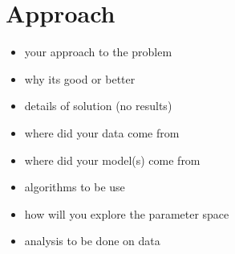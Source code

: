 \section{Approach} \label{sec:Approach}

\begin{itemize}
  \item
    your approach to the problem
  \item
    why its good or better
  \item
    details of solution (no results)
  \item
    where did your data come from
  \item
    where did your model(s) come from
  \item
    algorithms to be use
  \item
    how will you explore the parameter space
  \item
    analysis to be done on data
\end{itemize}
